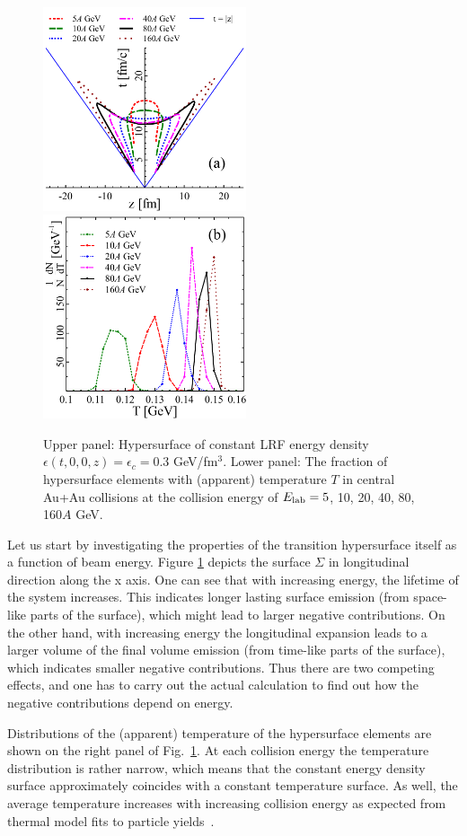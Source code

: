 \begin{figure}[htp]
\includegraphics[height=6cm]{plots/cooper_frye/TZ.pdf}
\includegraphics[height=6cm]{plots/cooper_frye/T_on_surf.pdf}
\caption{ Upper panel: Hypersurface of constant LRF
  energy density $\epsilon(t,0,0,z) = \epsilon_c = 0.3$
  GeV/fm$^3$. Lower panel: The fraction of hypersurface elements with
  (apparent) temperature $T$ in central Au+Au collisions at the
  collision energy of $E_\mathrm{lab} = 5$, 10, 20, 40, 80, 160$A$ GeV.}
\label{Fig:surf}
\end{figure}

Let us start by investigating the properties of the transition
hypersurface itself as a function of beam energy. Figure
\ref{Fig:surf} depicts the surface $\Sigma$ in longitudinal direction
along the x axis. One can see that with increasing energy, the lifetime of
the system increases. This indicates longer lasting surface emission
(from space-like parts of the surface), which might lead to larger
negative contributions. On the other hand, with increasing energy the
longitudinal expansion leads to a larger volume of the final volume
emission (from time-like parts of the surface), which indicates
smaller negative contributions. Thus there are two competing effects,
and one has to carry out the actual calculation to find out how the
negative contributions depend on energy.

Distributions of the (apparent) temperature of the hypersurface
elements are shown on the right panel of Fig.~\ref{Fig:surf}. At each
collision energy the temperature distribution is rather narrow, which
means that the constant energy density surface approximately coincides
with a constant temperature surface. As well, the average temperature
increases with increasing collision energy as expected from thermal
model fits to particle yields~\cite{Andronic:2008gu}.

